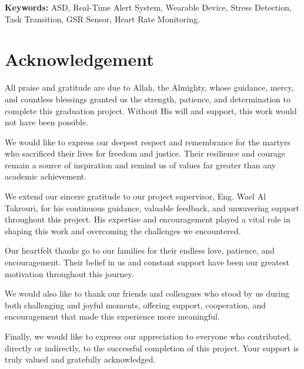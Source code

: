 \documentclass[a4paper,12pt]{report}
\begin{document}
\textbf{Keywords:}
ASD, Real-Time Alert System, Wearable Device, Stress Detection, Task Transition, GSR Sensor, Heart Rate Monitoring.

\newpage

\newpage

\chapter*{\centering Acknowledgement}

\justifying
All praise and gratitude are due to Allah, the Almighty, whose guidance, mercy, and countless blessings granted us the strength, patience, and determination to complete this graduation project. Without His will and support, this work would not have been possible. 

We would like to express our deepest respect and remembrance for the martyrs who sacrificed their lives for freedom and justice. Their resilience and courage remain a source of inspiration and remind us of values far greater than any academic achievement.

We extend our sincere gratitude to our project supervisor, Eng. Wael Al Takrouri, for his continuous guidance, valuable feedback, and unwavering support throughout this project. His expertise and encouragement played a vital role in shaping this work and overcoming the challenges we encountered.

Our heartfelt thanks go to our families for their endless love, patience, and encouragement. Their belief in us and constant support have been our greatest motivation throughout this journey.

We would also like to thank our friends and colleagues who stood by us during both challenging and joyful moments, offering support, cooperation, and encouragement that made this experience more meaningful.

Finally, we would like to express our appreciation to everyone who contributed, directly or indirectly, to the successful completion of this project. Your support is truly valued and gratefully acknowledged.
\tableofcontents
\clearpage

\listoffigures
\clearpage

\listoftables
\clearpage

\setlength{\nomlabelwidth}{3cm} %
\renewcommand{\nomlabel}[1]{#1 \hfill}
\end{document}
